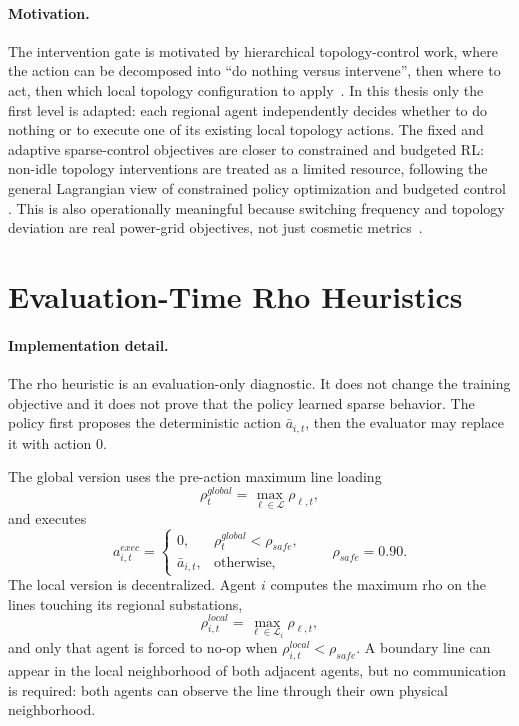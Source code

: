 \paragraph{Motivation.}
The intervention gate is motivated by hierarchical topology-control work, where
the action can be decomposed into ``do nothing versus intervene'', then where to
act, then which local topology configuration to apply~\cite{manczak2023hrl,
vandersar2023hmarl}. In this thesis only the first level is adapted: each
regional agent independently decides whether to do nothing or to execute one of
its existing local topology actions. The fixed and adaptive sparse-control
objectives are closer to constrained and budgeted RL: non-idle topology
interventions are treated as a limited resource, following the general
Lagrangian view of constrained policy optimization and budgeted control
\cite{achiam2017cpo,stooke2020pid,carrara2019budgeted}. This is also
operationally meaningful because switching frequency and topology deviation are
real power-grid objectives, not just cosmetic metrics~\cite{lautenbacher2025morl}.

\section{Evaluation-Time Rho Heuristics}
\label{subsec:sparse-control-heuristics}

\paragraph{Implementation detail.}
The rho heuristic is an evaluation-only diagnostic. It does not change the
training objective and it does not prove that the policy learned sparse
behavior. The policy first proposes the deterministic action \(\bar a_{i,t}\),
then the evaluator may replace it with action \(0\).

The global version uses the pre-action maximum line loading
\[
  \rho_t^{global}=\max_{\ell\in\mathcal L}\rho_{\ell,t},
\]
and executes
\[
  a_{i,t}^{exec}=
  \begin{cases}
    0, & \rho_t^{global}<\rho_{safe},\\
    \bar a_{i,t}, & \text{otherwise,}
  \end{cases}
  \qquad \rho_{safe}=0.90.
\]
The local version is decentralized. Agent \(i\) computes the maximum rho on the
lines touching its regional substations,
\[
  \rho_{i,t}^{local}=\max_{\ell\in\mathcal L_i}\rho_{\ell,t},
\]
and only that agent is forced to no-op when
\(\rho_{i,t}^{local}<\rho_{safe}\). A boundary line can appear in the local
neighborhood of both adjacent agents, but no communication is required: both
agents can observe the line through their own physical neighborhood.

